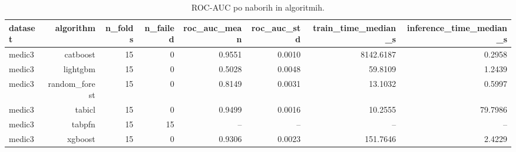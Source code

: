 \begin{table}[htbp]
\centering
\caption{ROC-AUC po naborih in algoritmih.}
\label{tab:per-dataset}
\begin{tabular}{lrrrrrrr}
\hline
dataset & algorithm & n\_folds & n\_failed & roc\_auc\_mean & roc\_auc\_std & train\_time\_median\_s & inference\_time\_median\_s \\
\hline
medic3 & catboost & 15 & 0 & 0.9551 & 0.0010 & 8142.6187 & 0.2958 \\
medic3 & lightgbm & 15 & 0 & 0.5028 & 0.0048 & 59.8109 & 1.2439 \\
medic3 & random\_forest & 15 & 0 & 0.8149 & 0.0031 & 13.1032 & 0.5997 \\
medic3 & tabicl & 15 & 0 & 0.9499 & 0.0016 & 10.2555 & 79.7986 \\
medic3 & tabpfn & 15 & 15 & -- & -- & -- & -- \\
medic3 & xgboost & 15 & 0 & 0.9306 & 0.0023 & 151.7646 & 2.4229 \\
\hline
\end{tabular}
\end{table}
